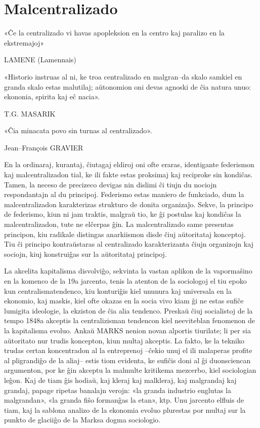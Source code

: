 \section*{Malcentralizado}
\indent 

«Ĉe la centralizado vi havas apopleksion en la centro kaj paralizo en la ekstremajoj»

LAMENE (Lamennais)

«Historio instruas al ni, ke troa centralizado en malgran–da skalo samkiel en granda skalo estas malutilaj; aŭtonomion oni devas agnoski de ĉia natura unuo: ekononia, spirita kaj eĉ nacia».

T.G. MASARIK

«Ĉia minacata povo sin turnas al centralizado».

Jean–François GRAVIER

En la ordinaraj, kurantaj, ĉiutagaj eldiroj oni ofte eraras, identigante federismon kaj malcentralizadon tial, ke ili fakte estas proksimaj kaj reciproke sin kondiĉas. Tamen, la neceso de precizeco devigas nin dislimi ĉi tiujn du nociojn respondantajn al du principoj. Federismo estas maniero de funkciado, dum la malcentralizadon karakterizas strukturo de donita organizaĵo. Sekve, la principo de federismo, kiun ni jam traktis, malgraŭ tio, ke ĝi postulas kaj kondiĉas la malcentralizadon, tute ne elĉerpas ĝin. La malcentralizado same presentas principon, kiu radikale distingas anarkiismon disde ĉiuj aŭtoritataj konceptoj. Tiu ĉi principo kontraŭstaras al centralizado karakterizanta ĉiujn organizojn kaj sociojn, kiuj konstruiĝas sur la aŭtoritataj principoj.

La akcelita kapitalisma disvolviĝo, sekvinta la vastan aplikon de la vapormaŝino en la komenco de la 19a jarcento, tenis la atenton de la sociologoj el tiu epoko kun centralismatendenco, kiu konturiĝis kiel ununura kaj universala en la ekonomio, kaj maskis, kiel ofte okazas en la socia vivo kiam ĝi ne estas sufiĉe lumigita ideologie, la ekziston de ĉia alia tendenco. Preskaŭ ĉiuj socialistoj de la tempo 1848a akceptis la centralizisman tendencon kiel neeviteblan fenomenon de la kapitalisma evoluo. Ankaŭ MARKS nenion novan alportis tiurilate; li per sia aŭtoritato nur trudis koncepton, kiun multaj akceptis. La fakto, ke la tekniko trudas certan koncentradon al la entreprenoj –ĉekio unuj el ili malaperas profite al pligrandiĝo de la aliaj– estis tiom evidenta, ke sufiĉis doni al ĝi duonsciencan argumenton, por ke ĝin akceptu la malmulte kritikema mezcerbo, kiel sociologian leĝon. Kaj de tiam ĝis hodiaŭ, kaj kleraj kaj malkleraj, kaj malgrandaj kaj grandaj, papage ripetas banalajn verojn: «la granda industrio englutas la malgrandan», «la granda fiŝo formanĝas la etan», ktp. Unu jarcento elfluis de tiam, kaj la sablona analizo de la ekonomia evoluo plurestas por multaj sur la punkto de glaciiĝo de la Marksa dogma sociologio.

